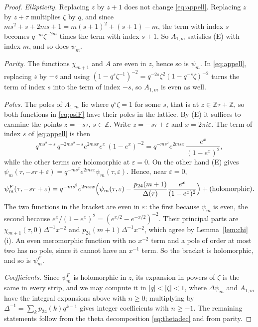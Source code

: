 \documentclass[11pt]{amsart}
\theoremstyle{definition}
\newcommand{\ZZ}{\mathbb{Z}}
\newcommand{\pf}{p_{24}}
\begin{document}
\begin{proof}
\emph{Ellipticity.} Replacing $z$ by $z+1$ does not change \eqref{eq:appell}. Replacing $z$ by $z+\tau$ multiplies $\zeta$ by $q$, and since $ms^2+s+2ms+1=m(s+1)^2+(s+1)-m$, the term with index $s$ becomes $q^{-m}\zeta^{-2m}$ times the term with index $s+1$. So $A_{1,m}$ satisfies (E) with index $m$, and so does $\psi_m$.

\emph{Parity.} The functions $\chi_{m+1}$ and $A$ are even in $z$, hence so is $\psi_m$. In \eqref{eq:appell}, replacing $z$ by $-z$ and using $(1-q^s\zeta^{-1})^{-2}=q^{-2s}\zeta^2(1-q^{-s}\zeta)^{-2}$ turns the term of index $s$ into the term of index $-s$, so $A_{1,m}$ is even as well.

\emph{Poles.} The poles of $A_{1,m}$ lie where $q^s\zeta=1$ for some $s$, that is at $z\in\ZZ\tau+\ZZ$, so both functions in \eqref{eq:psiF} have their poles in the lattice. By (E) it suffices to examine the points $z=-s\tau$, $s\in\ZZ$. Write $z=-s\tau+\varepsilon$ and $x=2\pi i\varepsilon$. The term of index $s$ of \eqref{eq:appell} is then
\[
q^{ms^2+s}\,q^{-2ms^2-s}e^{2msx}e^{x}\,(1-e^{x})^{-2}=q^{-ms^2}e^{2msx}\,\frac{e^x}{(1-e^x)^2},
\]
while the other terms are holomorphic at $\varepsilon=0$. On the other hand (E) gives $\psi_m(\tau,-s\tau+\varepsilon)=q^{-ms^2}e^{2msx}\psi_m(\tau,\varepsilon)$. Hence, near $\varepsilon=0$,
\[
\psi^F_m(\tau,-s\tau+\varepsilon)=q^{-ms^2}e^{2msx}\Bigl(\psi_m(\tau,\varepsilon)-\frac{\pf(m+1)}{\Delta(\tau)}\frac{e^x}{(1-e^x)^2}\Bigr)+(\text{holomorphic}).
\]
The two functions in the bracket are even in $\varepsilon$: the first because $\psi_m$ is even, the second because $e^x/(1-e^x)^2=(e^{x/2}-e^{-x/2})^{-2}$. Their principal parts are $\chi_{m+1}(\tau,0)\Delta^{-1}x^{-2}$ and $\pf(m+1)\Delta^{-1}x^{-2}$, which agree by Lemma~\ref{lem:chi}(i). An even meromorphic function with no $x^{-2}$ term and a pole of order at most two has no pole, since it cannot have an $x^{-1}$ term. So the bracket is holomorphic, and so is $\psi^F_m$.

\emph{Coefficients.} Since $\psi^F_m$ is holomorphic in $z$, its expansion in powers of $\zeta$ is the same in every strip, and we may compute it in $|q|<|\zeta|<1$, where $\Delta\psi_m$ and $A_{1,m}$ have the integral expansions above with $n\ge0$; multiplying by $\Delta^{-1}=\sum_k\pf(k)q^{k-1}$ gives integer coefficients with $n\ge-1$. The remaining statements follow from the theta decomposition \eqref{eq:thetadec} and from parity.
\end{proof}
\end{document}
